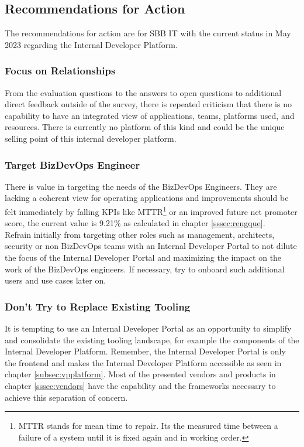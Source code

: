 \documentclass[a4paper,12pt]{article}
\begin{document}
    \subsection{Recommendations for Action}
    \label{subsec:arec}
    The recommendations for action are for SBB IT with the current status in May 2023 regarding the Internal Developer Platform.

    \subsubsection{Focus on Relationships}
    From the evaluation questions to the answers to open questions to additional direct feedback outside of the survey,
    there is repeated criticism that there is no capability to have an integrated view of applications, teams, platforms
    used, and resources.
    There is currently no platform of this kind and could be the unique selling point of this internal developer platform.

    \subsubsection{Target BizDevOps Engineer}
    There is value in targeting the needs of the BizDevOps Engineers.
    They are lacking a coherent view for operating applications and improvements should be felt immediately by falling
    KPIs like MTTR\footnote{MTTR stands for mean time to repair. Its the measured time between a failure of a system
    until it is fixed again and in working order.} or an improved future net promoter score, the current value is 9.21\%
    as calculated in chapter \ref{sssec:rengque}.\\
    Refrain initially from targeting other roles such as management, architects, security or non BizDevOps teams with
    an Internal Developer Portal to not dilute the focus of the Internal Developer Portal and maximizing the impact on
    the work of the BizDevOps engineers.
    If necessary, try to onboard such additional users and use cases later on.

    \subsubsection{Don't Try to Replace Existing Tooling}
    It is tempting to use an Internal Developer Portal as an opportunity to simplify and consolidate the existing tooling
    landscape, for example the components of the Internal Developer Platform.
    Remember, the Internal Developer Portal is only the frontend and makes the Internal Developer Platform accessible
    as seen in chapter \ref{subsec:vpplatform}.
    Most of the presented vendors and products in chapter \ref{sssec:vendors} have the capability and the frameworks
    necessary to achieve this separation of concern.
\end{document}
